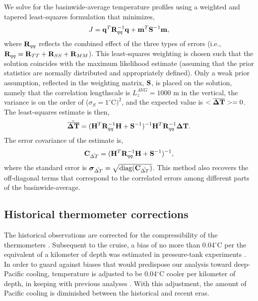 \documentclass[12pt]{article}
\begin{document}
We solve for the basinwide-average temperature profiles using a
weighted and tapered least-squares formulation that minimizes, 
\begin{equation}
\label{eq:qWq}
J = {\bf q}^T {\bf R}_{qq}^{-1} {\bf q} + {\bf m}^T {\bf S}^{-1} {\bf m},
\end{equation}  
where ${\bf R}_{qq}$ reflects the combined effect of the three types of errors (i.e., ${\bf R}_{qq} = {\bf R}_{TT} + {\bf R}_{SS} + {\bf R}_{MM}$). This least-squares weighting %
is chosen such that the solution coincides with the maximum likelihood estimate (assuming that the prior statistics are normally distributed and appropriately defined).
Only a weak prior assumption, reflected in the weighting matrix, ${\bf
  S}$, is placed on the solution, namely that the correlation
lengthscale is $L_z^{AVG} = 1000$ m in the vertical, the variance is on the order of
($\sigma_S = 1^\circ$C$)^2$, and the expected value is $<\overline{{\boldsymbol \Delta}{\bf T}}>=0$.
The least-squares estimate is then,
\begin{equation}
\tilde{\overline{{\boldsymbol \Delta}{\bf T}}} = ({\bf H}^T {\bf R}_{qq}^{-1} {\bf H} + {\bf S}^{-1} )^{-1} {\bf H}^T {\bf R}_{qq}^{-1} {\boldsymbol \Delta}{\bf T}.
\end{equation}
 The error covariance of the estimate is,
\begin{equation}
  \label{eq:covariance17}
  \mbox{{\bf C}}_{{\tilde{\Delta T}}} = ({\bf H}^T {\bf R}_{qq}^{-1} {\bf H} + {\bf S}^{-1} )^{-1},
\end{equation}
where the standard error is
${\boldsymbol \sigma}_{\tilde{\Delta T}} =
\sqrt{\mbox{diag}(\mbox{{\bf C}}_{{\tilde{\Delta T}}})}$.  This method
also recovers the off-diagonal terms that correspond to the correlated
errors among different parts of the basinwide-average.

\subsection{Historical thermometer corrections}

The historical observations are corrected for the
compressibility of the thermometers \cite{Tait--1882:Pressure}.
Subsequent to the cruise, a bias of no more than 0.04$^\circ$C per the
equivalent of a kilometer of depth was estimated in pressure-tank
experiments \cite{Tait--1882:Pressure}. In order to guard against
biases that would predispose our analysis toward deep-Pacific cooling,
temperature is adjusted to be 0.04$^\circ$C cooler per kilometer of
depth, in keeping with previous analyses
\cite{Roemmich-Gould-2012:135}. With this adjustment, the amount of
Pacific cooling is diminished between the historical and recent eras.
\end{document}
